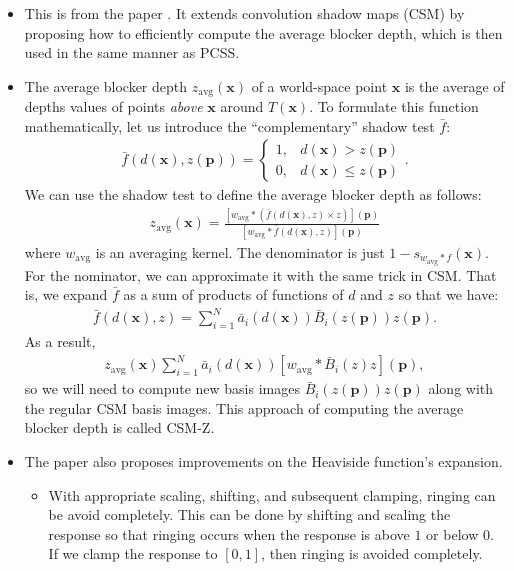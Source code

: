 \documentclass[10pt]{article}
\newcommand{\ve}[1]{\mathbf{#1}}
\newcommand{\avg}{\mathrm{avg}}
\begin{document}
  \begin{itemize}
  	\item This is from the paper \cite{Annen:2008}.  It extends convolution shadow maps (CSM) by proposing how to efficiently compute the average blocker depth, which is then used in the same manner as PCSS.

  	\item The average blocker depth $z_{\avg}(\ve{x})$ of a world-space point $\ve{x}$ is the average of depths values of points \emph{above} $\ve{x}$ around $T(\ve{x})$.  To formulate this function mathematically, let us introduce the ``complementary'' shadow test $\bar{f}$:
  	\begin{align*}
  		\bar{f}(d(\ve{x}), z(\ve{p})) = \begin{cases}
  			1, & d(\ve{x}) > z(\ve{p}) \\
  			0, & d(\ve{x}) \leq z(\ve{p})
  		\end{cases}.
  	\end{align*}
  	We can use the shadow test to define the average blocker depth as follows:
  	\begin{align*}
  		z_{\avg}(\ve{x}) = \frac{[w_{\avg} * (\bar{f}(d(\ve{x}),z)\times z)](\ve{p})}{[w_{\avg} * \bar{f}(d(\ve{x}),z)](\ve{p})}
  	\end{align*}
  	where $w_{\avg}$ is an averaging kernel.  The denominator is just $1 - s_{w_{\avg} * f}(\ve{x})$.  For the nominator, we can approximate it with the same trick in CSM.  That is, we expand $\bar{f}$ as a sum of products of functions of $d$ and $z$ so that we have:
  	\begin{align*}
  		\bar{f}(d(\ve{x}),z) = \sum_{i=1}^N \bar{a}_i(d(\ve{x})) \bar{B}_i(z(\ve{p})) z(\ve{p}).
  	\end{align*}
  	As a result,
  	\begin{align*}
  		z_{\avg}(\ve{x}) \sum_{i=1}^N \bar{a}_i(d(\ve{x})) [ w_{\avg} * \bar{B}_i(z) z] (\ve{p}),
  	\end{align*}
  	so we will need to compute new basis images $\bar{B}_i(z(\ve{p})) z(\ve{p})$ along with the regular CSM basis images.  This approach of computing the average blocker depth is called CSM-Z.

  	\item The paper also proposes improvements on the Heaviside function's expansion.
  	\begin{itemize}
  		\item With appropriate scaling, shifting, and subsequent clamping, ringing can be avoid completely.  This can be done by shifting and scaling the response so that ringing occurs when the response is above $1$ or below $0$.  If we clamp the response to $[0,1]$, then ringing is avoided completely.


\end{itemize}
\end{itemize}
\end{document}
